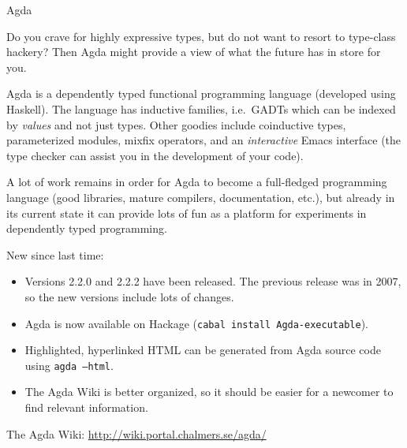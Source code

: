\documentclass{article}
\begin{document}
\begin{hcarentry}[updated]{Agda}
\label{agda}
\makeheader

Do you crave for highly expressive types, but do not want to resort to
type-class hackery? Then Agda might provide a view of what the future
has in store for you.

Agda is a dependently typed functional programming language (developed
using Haskell). The language has inductive families, i.e.\ GADTs which
can be indexed by \emph{values} and not just types. Other goodies
include coinductive types, parameterized modules, mixfix operators,
and an \emph{interactive} Emacs interface (the type checker can assist
you in the development of your code).

A lot of work remains in order for Agda to become a full-fledged
programming language (good libraries, mature compilers, documentation,
etc.), but already in its current state it can provide lots of fun as
a platform for experiments in dependently typed programming.

New since last time:
\begin{itemize}
\item Versions 2.2.0 and 2.2.2 have been released. The previous
  release was in 2007, so the new versions include lots of changes.
\item Agda is now available on Hackage (\texttt{cabal install
    Agda-executable}).
\item Highlighted, hyperlinked HTML can be generated from Agda source
  code using \texttt{agda --html}.
\item The Agda Wiki is better organized, so it should be easier for a
  newcomer to find relevant information.
\end{itemize}

\FurtherReading
  The Agda Wiki: \url{http://wiki.portal.chalmers.se/agda/}
\end{hcarentry}
\end{document}
